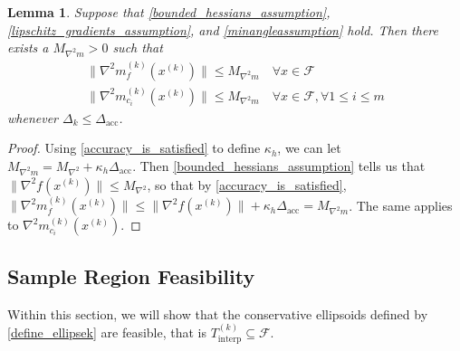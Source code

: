 \documentclass{article}
\newtheorem{lemma}[theorem]{Lemma}
\theoremstyle{case}
\numberwithin{theorem}{subsection}
\newcommand{\dacc}{{\Delta_{\textrm{acc}}}}
\newcommand{\dk}{\Delta_k}
\newcommand{\feasible}{{\mathcal F}}
\newcommand{\fik}{{\mathcal F_{i, k}}}
\newcommand{\hk}{{\nabla^2m_f^{(k)}(x^{(k)})}}
\newcommand{\maxhessian}{{M_{\nabla^2}}}
\newcommand{\maxmodelhessian}{{M_{\nabla^2 m}}}
\newcommand{\sampletrk}{{T_{\text{interp}}^{(k)}}}
\newcommand{\tr}{{ B_{\infty}\left(\xk, \dk\right) }}
\newcommand{\xk}{{x^{(k)}}}
\begin{document}
\begin{lemma}
\label{bounded_model_hessian_lemma}
Suppose that \cref{bounded_hessians_assumption}, \cref{lipschitz_gradients_assumption}, and \cref{minangleassumption} hold.
Then there exists a $\maxmodelhessian > 0$ such that 
\begin{align*}
\| \hk \| \le \maxmodelhessian \quad \forall x \in \feasible \\
\|\nabla^2 m_{c_i}^{(k)}(\xk) \| \le \maxmodelhessian \quad \forall x \in \feasible, \forall 1 \le i \le m
\end{align*}
whenever $\dk \le \dacc$.
\end{lemma}

\begin{proof}
Using \cref{accuracy_is_satisfied} to define $\kappa_h$, we can let $\maxmodelhessian = \maxhessian + \kappa_h \dacc$.
Then \cref{bounded_hessians_assumption} tells us that
$\|\nabla^2 f(\xk)\| \le \maxhessian$, so that by \cref{accuracy_is_satisfied},
$\|\hk\| \le \|\nabla^2 f(\xk)\| + \kappa_h\dacc = \maxmodelhessian$.
The same applies to $\nabla^2 m_{c_i}^{(k)}(\xk)$.
\end{proof}

\subsection{Sample Region Feasibility}
\label{ellipsoid_is_feasible_section}

Within this section, we will show that the conservative ellipsoids defined by \cref{define_ellipsek} are feasible, that is $\sampletrk \subseteq \feasible$.
\end{document}
